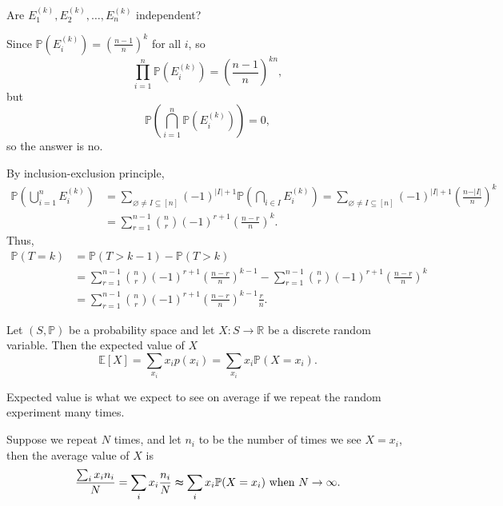 \begin{explanation}
\begin{question}
        Are \(E_1^{(k)}, E_2^{(k)}, \dots , E_n^{(k)}\) independent? 
    \end{question}
    \begin{answer}
        Since \(\mathbb{P} \left( E_i^{(k)} \right) = \left( \frac{n-1}{n} \right)^k\) for all \(i\), so
        \[
            \prod _{i=1}^n \mathbb{P} (E_i^{(k)}) = \left( \frac{n-1}{n} \right)^{kn},
        \] but
        \[
            \mathbb{P} \left( \bigcap_{i=1}^{n} \mathbb{P} (E_i^{(k)})  \right) = 0, 
        \]
        so the answer is no.
    \end{answer}
    By inclusion-exclusion principle,
    \begin{align*}
        \mathbb{P} \left( \bigcup_{i=1}^{n} E_i^{(k)}  \right) &= \sum_{\varnothing \neq I \subseteq [n]} (-1)^{\vert I \vert + 1} \mathbb{P} \left( \bigcap_{i \in I} E_i^{(k)}  \right) = \sum_{\varnothing \neq I \subseteq [n]} (-1)^{\vert I \vert  + 1} \left( \frac{n - \vert I \vert }{n} \right)^k \\
        &= \sum_{r=1}^{n-1} \binom{n}{r} (-1)^{r+1} \left( \frac{n-r}{n} \right)^k. 
    \end{align*}
    Thus, 
    \begin{align*}
        \mathbb{P} (T = k) &= \mathbb{P} (T > k - 1) - \mathbb{P} (T > k) \\
        &= \sum_{r=1}^{n-1} \binom{n}{r} (-1)^{r+1} \left( \frac{n-r}{n} \right)^{k-1} - \sum_{r=1}^{n-1} \binom{n}{r} (-1)^{r+1} \left( \frac{n-r}{n} \right)^k \\
        &= \sum_{r=1}^{n-1} \binom{n}{r} (-1)^{r+1} \left( \frac{n-r}{n} \right)^{k-1} \frac{r}{n}.    
    \end{align*}
    

\end{explanation}

\begin{definition}
    Let \((S, \mathbb{P})\) be a probability space and let \(X: S \to \mathbb{R} \) be a discrete random variable. Then the expected value of \(X\) 
    \[
        \mathbb{E} [X] = \sum_{x_i} x_i p(x_i) = \sum_{x_i} x_i \mathbb{P} (X = x_i).  
    \]  
\end{definition}

\begin{remark}
    Expected value is what we expect to see on average if we repeat the random experiment many times.
\end{remark}

Suppose we repeat \(N\) times, and let \(n_i\) to be the number of times we see \(X = x_i\), then the average value of \(X\) is 
\[
    \frac{\sum_{i} x_i n_i }{N} = \sum_{i} x_i \frac{n_i}{N} \thickapprox \sum_{i} x_i \mathbb{P} (X = x_i) \text{ when } N \to \infty .   
\]    

